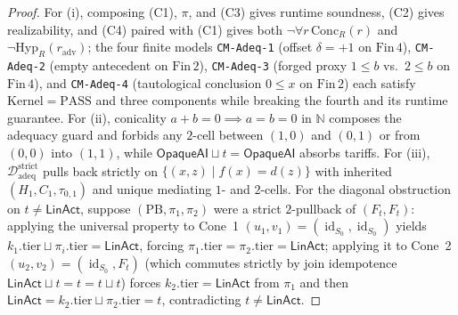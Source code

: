 \documentclass[11pt]{article}
\theoremstyle{plain}
\theoremstyle{definition}
\DeclareMathOperator{\id}{id}
\begin{document}
\begin{proof}
For (i), composing \textup{(C1)}, $\pi$, and \textup{(C3)} gives runtime soundness, \textup{(C2)} gives realizability, and \textup{(C4)} paired with \textup{(C1)} gives both $\neg\forall r\,\mathrm{Conc}_R(r)$ and $\neg\mathrm{Hyp}_R(r_{\mathrm{adv}})$; the four finite models \texttt{CM-Adeq-1} (offset $\delta = +1$ on $\mathrm{Fin}\,4$), \texttt{CM-Adeq-2} (empty antecedent on $\mathrm{Fin}\,2$), \texttt{CM-Adeq-3} (forged proxy $1 \le b$ vs.\ $2 \le b$ on $\mathrm{Fin}\,4$), and \texttt{CM-Adeq-4} (tautological conclusion $0 \le x$ on $\mathrm{Fin}\,2$) each satisfy $\mathrm{Kernel} = \mathrm{PASS}$ and three components while breaking the fourth and its runtime guarantee. For (ii), conicality $a + b = 0 \implies a = b = 0$ in $\mathbb{N}$ composes the adequacy guard and forbids any $2$-cell between $(1,0)$ and $(0,1)$ or from $(0,0)$ into $(1,1)$, while $\mathsf{OpaqueAI} \sqcup t = \mathsf{OpaqueAI}$ absorbs tariffs. For (iii), $\mathcal{D}_{\mathrm{adeq}}^{\mathrm{strict}}$ pulls back strictly on $\{(x,z) \mid f(x) = d(z)\}$ with inherited $(H_1, C_1, \tau_{0,1})$ and unique mediating $1$- and $2$-cells. For the diagonal obstruction on $t \neq \mathsf{LinAct}$, suppose $(\mathrm{PB}, \pi_1, \pi_2)$ were a strict $2$-pullback of $(F_t, F_t)$: applying the universal property to Cone~1 $(u_1, v_1) = (\id_{S_0}, \id_{S_0})$ yields $k_1.\mathrm{tier} \sqcup \pi_i.\mathrm{tier} = \mathsf{LinAct}$, forcing $\pi_1.\mathrm{tier} = \pi_2.\mathrm{tier} = \mathsf{LinAct}$; applying it to Cone~2 $(u_2, v_2) = (\id_{S_0}, F_t)$ (which commutes strictly by join idempotence $\mathsf{LinAct} \sqcup t = t = t \sqcup t$) forces $k_2.\mathrm{tier} = \mathsf{LinAct}$ from $\pi_1$ and then $\mathsf{LinAct} = k_2.\mathrm{tier} \sqcup \pi_2.\mathrm{tier} = t$, contradicting $t \neq \mathsf{LinAct}$.
\end{proof}
\end{document}
